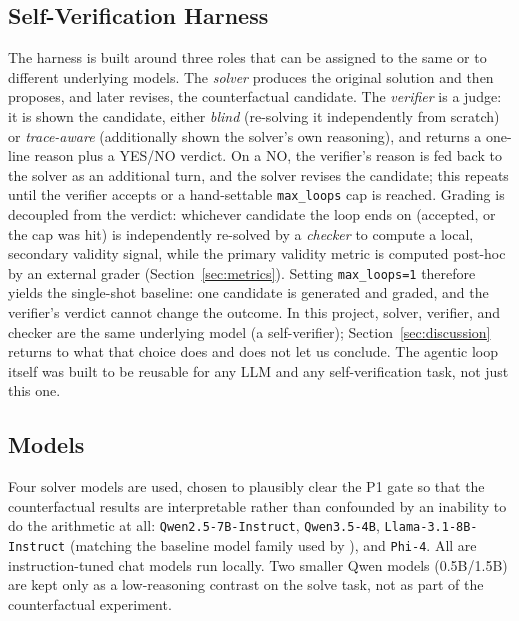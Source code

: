 \documentclass[twoside,twocolumn,10pt]{article}
\begin{document}
\subsection{Self-Verification Harness}
The harness is built around three roles that can be assigned to the same or to different underlying models. The \textit{solver} produces the original solution and then proposes, and later revises, the counterfactual candidate. The \textit{verifier} is a judge: it is shown the candidate, either \textit{blind} (re-solving it independently from scratch) or \textit{trace-aware} (additionally shown the solver's own reasoning), and returns a one-line reason plus a YES/NO verdict. On a NO, the verifier's reason is fed back to the solver as an additional turn, and the solver revises the candidate; this repeats until the verifier accepts or a hand-settable \texttt{max\_loops} cap is reached. Grading is decoupled from the verdict: whichever candidate the loop ends on (accepted, or the cap was hit) is independently re-solved by a \textit{checker} to compute a local, secondary validity signal, while the primary validity metric is computed post-hoc by an external grader (Section~\ref{sec:metrics}). Setting \texttt{max\_loops=1} therefore yields the single-shot baseline: one candidate is generated and graded, and the verifier's verdict cannot change the outcome. In this project, solver, verifier, and checker are the same underlying model (a self-verifier); Section~\ref{sec:discussion} returns to what that choice does and does not let us conclude. The agentic loop itself was built to be reusable for any LLM and any self-verification task, not just this one.

\subsection{Models}
Four solver models are used, chosen to plausibly clear the P1 gate so that the counterfactual results are interpretable rather than confounded by an inability to do the arithmetic at all: \texttt{Qwen2.5-7B-Instruct}, \texttt{Qwen3.5-4B}, \texttt{Llama-3.1-8B-Instruct} (matching the baseline model family used by \textcite{dehghanighobadi2025llmsexplaincounterfactually}), and \texttt{Phi-4}. All are instruction-tuned chat models run locally. Two smaller Qwen models (0.5B/1.5B) are kept only as a low-reasoning contrast on the solve task, not as part of the counterfactual experiment.
\end{document}
